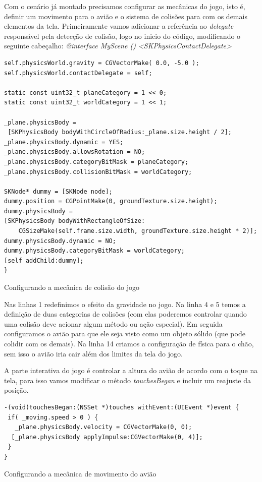 \documentclass[a4paper,12pt,brazil,oneside]{book}
\begin{document}
Com o cenário já montado precisamos configurar as mecânicas do jogo, isto é, definir um movimento para o avião e o sistema de colisões para com os demais elementos da tela.
Primeiramente vamos adicionar a referência ao  \emph{delegate} responsável pela detecção de colisão, logo no inicio do código, modificando o seguinte cabeçalho: \emph{@interface MyScene () <SKPhysicsContactDelegate>}
 
\begin{listing}[H]
\begin{verbatim}
self.physicsWorld.gravity = CGVectorMake( 0.0, -5.0 );
self.physicsWorld.contactDelegate = self;
        
static const uint32_t planeCategory = 1 << 0;
static const uint32_t worldCategory = 1 << 1;

_plane.physicsBody = 
 [SKPhysicsBody bodyWithCircleOfRadius:_plane.size.height / 2];
_plane.physicsBody.dynamic = YES;
_plane.physicsBody.allowsRotation = NO;
_plane.physicsBody.categoryBitMask = planeCategory;
_plane.physicsBody.collisionBitMask = worldCategory;
 
SKNode* dummy = [SKNode node];
dummy.position = CGPointMake(0, groundTexture.size.height);
dummy.physicsBody = 
[SKPhysicsBody bodyWithRectangleOfSize:
	CGSizeMake(self.frame.size.width, groundTexture.size.height * 2)];
dummy.physicsBody.dynamic = NO;
dummy.physicsBody.categoryBitMask = worldCategory;
[self addChild:dummy];       
}
\end{verbatim}
\caption{Configurando a mecânica de colisão do jogo}
\end{listing}

Nas linhas 1 redefinimos o efeito da gravidade no jogo. Na linha 4 e 5 temos a definição de duas categorias de colisões (com elas poderemos controlar quando uma colisão deve acionar algum método ou ação especial). Em seguida configuramos o avião para que ele seja visto como um objeto sólido (que pode colidir com os demais). Na linha 14 criamos a configuração de física para o chão, sem isso o avião iria cair além dos limites da tela do jogo.

A parte interativa do jogo é controlar a altura do avião de acordo com o toque na tela, para isso vamos modificar o método \emph{touchesBegan} e incluir um reajuste da posição.

\begin{listing}[H]
\begin{verbatim}
-(void)touchesBegan:(NSSet *)touches withEvent:(UIEvent *)event {
 if( _moving.speed > 0 ) {
   _plane.physicsBody.velocity = CGVectorMake(0, 0);
  [_plane.physicsBody applyImpulse:CGVectorMake(0, 4)];
 }  
}
\end{verbatim}
\caption{Configurando a mecânica de movimento do avião}
\end{listing}
\end{document}
